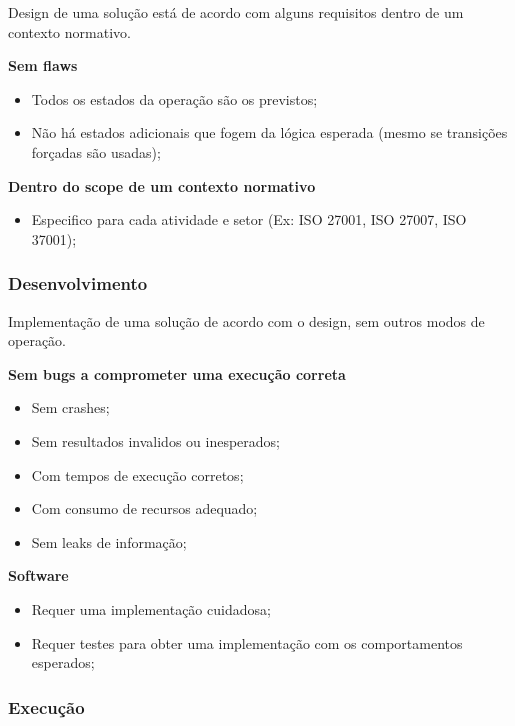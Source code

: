 \documentclass{article}
\begin{document}
Design de uma solução está de acordo com alguns requisitos dentro de um
contexto normativo.

\begin{flushleft}
  \textbf{Sem flaws}
  \begin{itemize}
    \item Todos os estados da operação são os previstos;
    \item Não há estados adicionais que fogem da lógica esperada (mesmo se transições forçadas são usadas);
  \end{itemize}

  \textbf{Dentro do scope de um contexto normativo}
  \begin{itemize}
    \item Especifico para cada atividade e setor (Ex: ISO 27001, ISO 27007, ISO 37001);
  \end{itemize}
\end{flushleft}

\subsubsection{Desenvolvimento}

Implementação de uma solução de acordo com o design, sem outros modos de operação.

\begin{flushleft}
  \textbf{Sem bugs a comprometer uma execução correta}
  \begin{itemize}
    \item Sem crashes;
    \item Sem resultados invalidos ou inesperados;
    \item Com tempos de execução corretos;
    \item Com consumo de recursos adequado;
    \item Sem leaks de informação;
  \end{itemize}

  \pagebreak

  \textbf{Software}
  \begin{itemize}
    \item Requer uma implementação cuidadosa;
    \item Requer testes para obter uma implementação com os comportamentos esperados;
  \end{itemize}
\end{flushleft}

\subsubsection{Execução}
\end{document}
